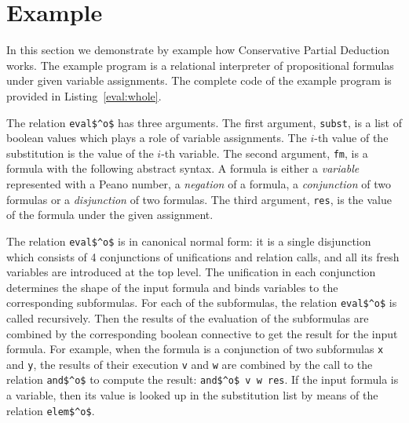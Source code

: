 \section{Example}

In this section we demonstrate by example how Conservative Partial Deduction works.
The example program is a relational interpreter of propositional formulas under given variable assignments.
The complete code of the example program is provided in Listing~\ref{eval:whole}.

The relation \lstinline{eval$^o$} has three arguments.
The first argument, \lstinline{subst}, is a list of boolean values which plays a role of variable assignments.
The $i$-th value of the substitution is the value of the $i$-th variable.
The second argument, \lstinline{fm}, is a formula with the following abstract syntax.
A formula is either a \emph{variable} represented with a Peano number, a \emph{negation} of a formula, a \emph{conjunction} of two formulas or a \emph{disjunction} of two formulas.
The third argument, \lstinline{res}, is the value of the formula under the given assignment.

The relation \lstinline{eval$^o$} is in canonical normal form: it is a single disjunction which consists of 4 conjunctions of unifications and relation calls, and all its fresh variables are introduced at the top level.
The unification in each conjunction determines the shape of the input formula and binds variables to the corresponding subformulas.
For each of the subformulas, the relation \lstinline{eval$^o$} is called recursively.
Then the results of the evaluation of the subformulas are combined by the corresponding boolean connective to get the result for the input formula.
For example, when the formula is a conjunction of two subformulas \lstinline{x} and \lstinline{y}, the results of their execution \lstinline{v} and \lstinline{w} are combined by the call to the relation \lstinline{and$^o$} to compute the result: \lstinline{and$^o$ v w res}.
If the input formula is a variable, then its value is looked up in the substitution list by means of the relation \lstinline{elem$^o$}.

